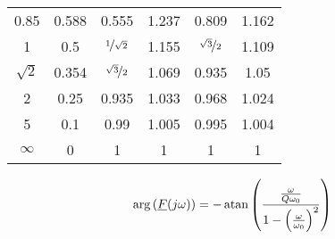 \documentclass{article}[11pt]
\begin{document}
\begin{table}[H]
\begin{tabular}{cccccc}
0.85                     & 0.588                     & 0.555                                      & 1.237                                                                                            & 0.809                                      & 1.162                                                                                            \\  
1                        & 0.5                       & $\nicefrac{1}{\sqrt{2}}$                   & 1.155                                                                                            & $\nicefrac{\sqrt{3}}{2}$                   & 1.109                                                                                            \\  
$\sqrt{2}$               & 0.354                     & $\nicefrac{\sqrt{3}}{2}$                   & 1.069                                                                                            & 0.935                                      & 1.05                                                                                             \\
2                        & 0.25                      & 0.935                                      & 1.033                                                                                            & 0.968                                      & 1.024                                                                                            \\ 
5                        & 0.1                       & 0.99                                       & 1.005                                                                                            & 0.995                                      & 1.004                                                                                            \\ 
$\infty$                 & 0                         & 1                                          & 1                                                                                                & 1                                          & 1                                                                                                \\ \toprule
\end{tabular}
\label{tab:char-fs}
\end{table}


\begin{equation}
\arg\left(\underline{F}(j\omega)\right)= 
  -\atan\left(\frac{\frac{\omega}{Q \omega_0}}
                   {1-\left(\frac{\omega}{\omega_0}\right)^2}\right)
\end{equation}
\end{document}
